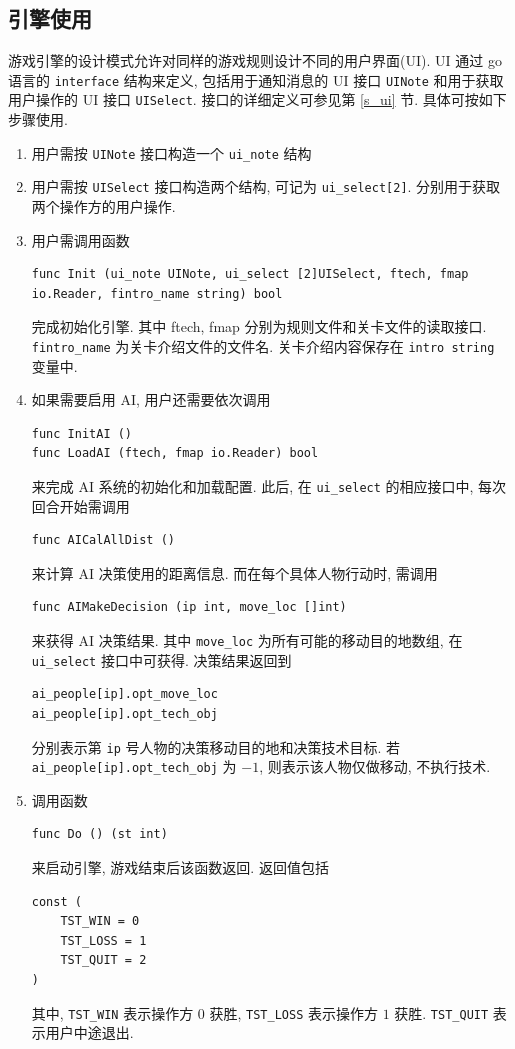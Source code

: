 \documentclass[UTF8, zihao=-4]{ctexart} %
\newcommand{\lcode}{\lstinline} % 段内插入代码
\begin{document}
\subsection{引擎使用}
游戏引擎的设计模式允许对同样的游戏规则设计不同的用户界面(UI). UI 通过 go 语言的 \lcode{interface} 结构来定义,
包括用于通知消息的 UI 接口 \lcode{UINote} 和用于获取用户操作的 UI 接口 \lcode{UISelect}.
接口的详细定义可参见第 \ref{s_ui} 节.
具体可按如下步骤使用.
\begin{enumerate}
      \item 用户需按 \lcode{UINote} 接口构造一个 \lcode{ui_note} 结构
      \item 用户需按 \lcode{UISelect} 接口构造两个结构, 可记为 \lcode{ui_select[2]}. 分别用于获取两个操作方的用户操作.
      \item 用户需调用函数
            \begin{lstlisting}
func Init (ui_note UINote, ui_select [2]UISelect, ftech, fmap io.Reader, fintro_name string) bool 
            \end{lstlisting}
            完成初始化引擎. 其中 ftech, fmap 分别为规则文件和关卡文件的读取接口. \lcode{fintro_name} 为关卡介绍文件的文件名.
            关卡介绍内容保存在 \lcode{intro string} 变量中.
      \item 如果需要启用 AI, 用户还需要依次调用
            \begin{lstlisting}
func InitAI ()
func LoadAI (ftech, fmap io.Reader) bool
            \end{lstlisting}
            来完成 AI 系统的初始化和加载配置. 此后, 在 \lcode{ui_select} 的相应接口中, 每次回合开始需调用
            \begin{lstlisting}
func AICalAllDist () 
            \end{lstlisting}
            来计算 AI 决策使用的距离信息.
            而在每个具体人物行动时, 需调用
            \begin{lstlisting}
func AIMakeDecision (ip int, move_loc []int)
            \end{lstlisting}
            来获得 AI 决策结果. 其中 \lcode{move_loc} 为所有可能的移动目的地数组, 在 \lcode{ui_select} 接口中可获得.
            决策结果返回到
            \begin{lstlisting}
ai_people[ip].opt_move_loc
ai_people[ip].opt_tech_obj
            \end{lstlisting}
            分别表示第 \lcode{ip} 号人物的决策移动目的地和决策技术目标. 若 \lcode{ai_people[ip].opt_tech_obj} 为 $-1$,
            则表示该人物仅做移动, 不执行技术.
      \item 调用函数  
            \begin{lstlisting}
func Do () (st int)
            \end{lstlisting}
            来启动引擎, 游戏结束后该函数返回. 返回值包括
            \begin{lstlisting}
const (
	TST_WIN = 0
	TST_LOSS = 1
	TST_QUIT = 2
)
            \end{lstlisting}
            其中, \lcode{TST_WIN} 表示操作方 $0$ 获胜, \lcode{TST_LOSS} 表示操作方 $1$ 获胜. \lcode{TST_QUIT} 表示用户中途退出.
\end{enumerate}
\end{document}
